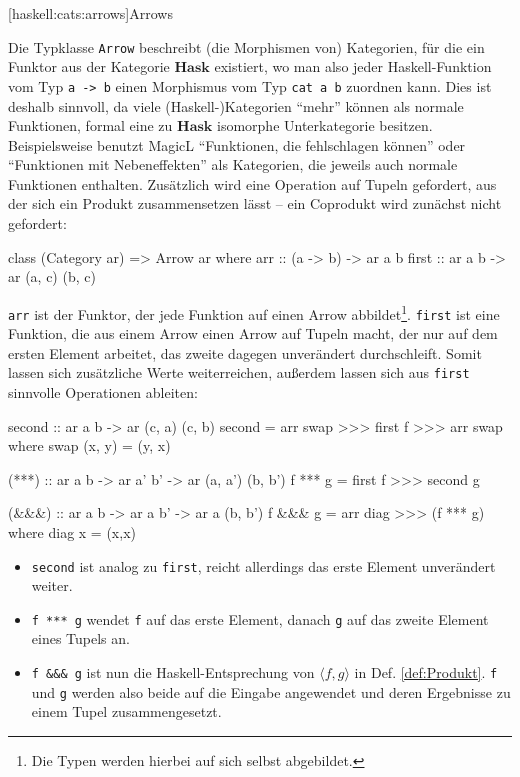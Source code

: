 \documentclass[11pt, a4paper, bibgerm]{scrbook}
\newenvironment{DIFnomarkup}{}{}
\newcommand\icode[1]{\lstinline?#1?}
\newcommand\lsubsection{}
\newcommand{\dref}[1]{Def. \ref{def:#1}}
\begin{document}
\lsubsection[haskell:cats:arrows]{Arrows}

Die Typklasse \icode{Arrow} beschreibt (die Morphismen von) Kategorien,
für die ein Funktor aus der Kategorie $\mathbf{Hask}$ existiert, wo man
also jeder Haskell-Funktion vom Typ \icode{a -> b} einen Morphismus vom
Typ \icode{cat a b} zuordnen kann. Dies ist deshalb sinnvoll, da viele
(Haskell-)Kategorien "`mehr"' können als normale Funktionen, formal eine zu
$\mathbf{Hask}$ isomorphe Unterkategorie besitzen. Beispielsweise
benutzt MagicL "`Funktionen, die fehlschlagen können"' oder "`Funktionen
mit Nebeneffekten"' als Kategorien, die jeweils auch normale Funktionen
enthalten. Zusätzlich wird eine Operation auf Tupeln gefordert, aus der
sich ein Produkt zusammensetzen lässt -- ein Coprodukt wird zunächst nicht gefordert:
\begin{DIFnomarkup}\begin{code}
class (Category ar) => Arrow ar where
  arr   :: (a -> b) -> ar a b
  first :: ar a b  -> ar (a, c) (b, c)
\end{code}\end{DIFnomarkup}
\icode{arr} ist der Funktor, der jede Funktion auf einen Arrow
abbildet\footnote{Die Typen werden hierbei auf sich selbst abgebildet.}.
\icode{first} ist eine Funktion, die aus einem Arrow einen Arrow auf
Tupeln macht, der nur auf dem ersten Element arbeitet, das zweite
dagegen unverändert durchschleift. Somit lassen sich zusätzliche Werte
weiterreichen, außerdem lassen sich aus \icode{first} sinnvolle
Operationen ableiten:

\begin{DIFnomarkup}\begin{code}
  second :: ar a b -> ar (c, a) (c, b)
  second = arr swap >>> first f >>> arr swap
    where swap (x, y) = (y, x)

  (***) :: ar a b -> ar a' b' -> ar (a, a') (b, b')
  f *** g = first f >>> second g

  (&&&) :: ar a b -> ar a b' -> ar a (b, b')
  f &&& g = arr diag >>> (f *** g)
    where diag x = (x,x)
\end{code}\end{DIFnomarkup} %

\begin{itemize}
\item \icode{second} ist analog zu \icode{first}, reicht allerdings das erste
Element unverändert weiter.
\item \icode{f *** g} wendet \icode{f} auf das
erste Element, danach \icode{g} auf das zweite Element eines Tupels
an.
\item \icode{f &&& g} ist nun die Haskell-Entsprechung von $\langle f,g
\rangle$ in \dref{Produkt}. \icode{f} und \icode{g} werden also beide
auf die Eingabe angewendet und deren Ergebnisse zu einem Tupel
zusammengesetzt.
\end{itemize}
\end{document}
